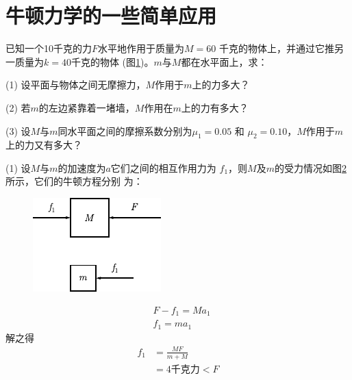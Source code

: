 \section{牛顿力学的一些简单应用}\label{sec:03.05}

\example 已知一个10千克的力$ F $水平地作用于质量为$ M = 6 0 $
千克的物体上，并通过它推另一质量为$ k = 4 0 $千克的物体
(图\ref{fig:03.08})。$ m $与$ M $都在水平面上，求：

(1) 设平面与物体之间无摩擦力，$ M $作用于$ m $上的力多大？

(2) 若$ m $的左边紧靠着一堵墙，$ M $作用在$ m $上的力有多大？

(3) 设$ M $与$ m $同水平面之间的摩擦系数分别为$ \mu _ { 1 } = 0 . 0 5 $ 和
$ \mu _ { 2 } = 0 . 1 0 $，$ M $作用于$ m $上的力又有多大？
\begin{figure}[!h]
    \centering
 \caption{}
 \label{fig:03.08}
\end{figure}

\solution (1) 设$ M $与$ m $的加速度为$ a $它们之间的相互作用力为
$f_1$，则$ M $及$ m $的受力情况如图\ref{fig:03.09} 所示，它们的牛顿方程分别
为：
\begin{figure}
    \centering
    \includegraphics{figure/fig03.09}
    \caption{}
    \label{fig:03.09}
\end{figure}
\vspace{-1.4em}
\begin{align*}
 &F - f _ { 1 } = M a _ { 1 } \\
 &f _ { 1 } = m a _ { 1 }
\end{align*}
解之得
\begin{align*}
 f _ { 1 } &= \frac { M F } { m + M } \\
  &=4\text{千克力} < F
\end{align*}

